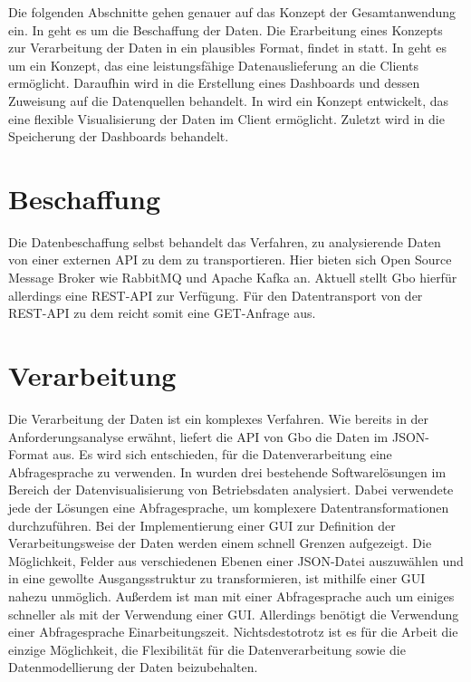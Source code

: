 Die folgenden Abschnitte gehen genauer auf das Konzept der Gesamtanwendung ein.
In  geht es um die Beschaffung der Daten. Die Erarbeitung eines Konzepts zur
Verarbeitung der Daten in ein plausibles Format, findet in  statt.
In  geht es um ein Konzept, das
eine leistungsfähige Datenauslieferung an die Clients ermöglicht.
Daraufhin wird in  die Erstellung eines Dashboards und dessen Zuweisung auf die
Datenquellen behandelt. In  wird ein Konzept entwickelt,
das eine flexible Visualisierung der Daten im Client ermöglicht.
Zuletzt wird in  die Speicherung der Dashboards behandelt.

\section{Beschaffung}
\label{sec:beschaffung}
Die Datenbeschaffung selbst behandelt das Verfahren, zu analysierende Daten
von einer externen API zu dem  zu transportieren.
Hier bieten sich Open Source Message Broker wie RabbitMQ und Apache Kafka an.
Aktuell stellt Gbo hierfür allerdings eine REST-API zur Verfügung.
Für den Datentransport von der REST-API zu dem  reicht somit
eine GET-Anfrage aus.

\section{Verarbeitung}
\label{sec:verarbeitung}
Die Verarbeitung der Daten ist ein komplexes Verfahren. Wie bereits in der
Anforderungsanalyse erwähnt, liefert die API von Gbo die Daten im
JSON-Format aus. Es wird sich entschieden,
für die Datenverarbeitung eine Abfragesprache zu verwenden. In 
wurden drei bestehende Softwarelösungen im Bereich der Datenvisualisierung von
Betriebsdaten analysiert. Dabei verwendete jede der Lösungen eine Abfragesprache,
um komplexere Datentransformationen durchzuführen. Bei der Implementierung einer
GUI zur Definition der Verarbeitungsweise der Daten werden einem schnell Grenzen aufgezeigt.
Die Möglichkeit, Felder aus verschiedenen Ebenen einer JSON-Datei auszuwählen
und in eine gewollte Ausgangsstruktur zu transformieren, ist mithilfe einer GUI nahezu
unmöglich. Außerdem ist man mit einer Abfragesprache auch um einiges schneller als mit
der Verwendung einer GUI. Allerdings benötigt die Verwendung einer Abfragesprache
Einarbeitungszeit. \mbox{Nichtsdestotrotz} ist es für die Arbeit die einzige Möglichkeit,
die Flexibilität für die Datenverarbeitung sowie die Datenmodellierung der Daten
beizubehalten.

